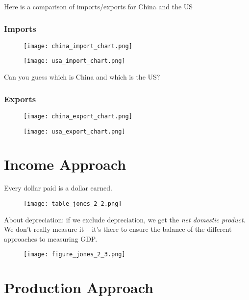 \documentclass{article}
\begin{document}
Here is a comparison of imports/exports for China and the US

\newpage

\subsubsection*{Imports}

\begin{figure}[htbp]
\texttt{[image: china\_import\_chart.png]}
\end{figure}

\begin{figure}[htbp]
\texttt{[image: usa\_import\_chart.png]}
\end{figure}

Can you guess which is China and which is the US?

\newpage

\subsubsection*{Exports}

\begin{figure}[htbp]
\texttt{[image: china\_export\_chart.png]}
\end{figure}

\begin{figure}[htbp]
\texttt{[image: usa\_export\_chart.png]}
\end{figure}

\section*{Income Approach}

Every dollar paid is a dollar earned.

\begin{figure}[h]
\texttt{[image: table\_jones\_2\_2.png]}
\end{figure}

About depreciation: if we exclude depreciation, we get the \textit{net domestic product}. We don't really measure it -- it's there to ensure the balance of the different approaches to measuring GDP.

\begin{figure}[h]
\texttt{[image: figure\_jones\_2\_3.png]}
\end{figure}

\section*{Production Approach}
\end{document}
